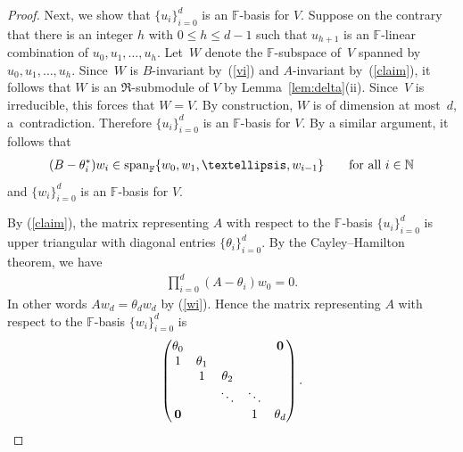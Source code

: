 \documentclass[11pt]{article}
\numberwithin{equation}{section}
\def\N{\mathbb N}
\def\F{\mathbb F}
\numberwithin{equation}{section}
\begin{document}
\begin{proof}
Next, we show that $\{u_i\}_{i=0}^d$ is an $\F$-basis for $V$. Suppose on the contrary that there is an integer $h$ with $0\leq h\leq d-1$ such that $u_{h+1}$ is an $\F$-linear combination of $u_0,u_1,\ldots,u_h$. Let~$W$ denote the $\F$-subspace of~$V$ spanned by $u_0,u_1,\ldots,u_h$.
Since~$W$ is $B$-invariant by~(\ref{vi}) and $A$-invariant by~(\ref{claim}), it follows that $W$ is an $\Re$-submodule of $V$ by Lemma~\ref{lem:delta}(ii). Since~$V$ is irreducible, this forces that $W=V$.
By construction, $W$ is of dimension at most~$d$, a~contradiction. Therefore $\{u_i\}_{i=0}^d$ is an $\F$-basis for $V$.
By a similar argument, it follows that
\begin{gather}\label{claim'}
(B-\theta_i^*) w_i\in \operatorname{span}_\F\{w_0,w_1,\ldots,w_{i-1}\}\qquad \hbox{for all $i\in \N$}
\end{gather}
and $\{w_i\}_{i=0}^d$ is an $\F$-basis for $V$.

By (\ref{claim}), the matrix representing $A$ with respect to the $\F$-basis $\{u_i\}_{i=0}^d$ is upper triangular with diagonal entries $\{\theta_i\}_{i=0}^d$. By the Cayley--Hamilton theorem, we have
\begin{gather}\label{CH}
\prod\limits_{i=0}^d (A-\theta_i) w_0=0.
\end{gather}
In other words $Aw_d=\theta_d w_d$ by (\ref{wi}). Hence the matrix representing $A$ with respect to the $\F$-basis $\{w_i\}_{i=0}^d$ is
\begin{gather*}
\begin{pmatrix}
\theta_0 & & & &{\bf 0}
\\
1 &\theta_1
\\
&1 &\theta_2
 \\
& &\ddots &\ddots
 \\
{\bf 0} & & &1 &\theta_d
\end{pmatrix}.
\end{gather*}


\end{proof}
\end{document}

